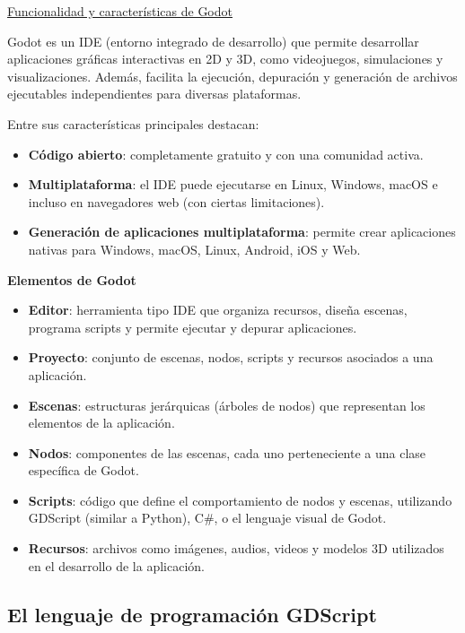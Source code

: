\documentclass[12pt]{book} %
\providecommand{\tightlist}{%
  \setlength{\itemsep}{0pt}\setlength{\parskip}{0pt}}
\begin{document}
\underline{Funcionalidad y características de Godot}

Godot es un IDE (entorno integrado de desarrollo) que permite
desarrollar aplicaciones gráficas interactivas en 2D y 3D, como
videojuegos, simulaciones y visualizaciones. Además, facilita la
ejecución, depuración y generación de archivos ejecutables
independientes para diversas plataformas.

Entre sus características principales destacan:

\begin{itemize}
\tightlist
\item
  \textbf{Código abierto}: completamente gratuito y con una comunidad
  activa.
\item
  \textbf{Multiplataforma}: el IDE puede ejecutarse en Linux, Windows,
  macOS e incluso en navegadores web (con ciertas limitaciones).
\item
  \textbf{Generación de aplicaciones multiplataforma}: permite crear
  aplicaciones nativas para Windows, macOS, Linux, Android, iOS y Web.
\end{itemize}

\textbf{Elementos de Godot}

\begin{itemize}
\tightlist
\item
  \textbf{Editor}: herramienta tipo IDE que organiza recursos, diseña
  escenas, programa scripts y permite ejecutar y depurar aplicaciones.
\item
  \textbf{Proyecto}: conjunto de escenas, nodos, scripts y recursos
  asociados a una aplicación.
\item
  \textbf{Escenas}: estructuras jerárquicas (árboles de nodos) que
  representan los elementos de la aplicación.
\item
  \textbf{Nodos}: componentes de las escenas, cada uno perteneciente a
  una clase específica de Godot.
\item
  \textbf{Scripts}: código que define el comportamiento de nodos y
  escenas, utilizando GDScript (similar a Python), C\#, o el lenguaje
  visual de Godot.
\item
  \textbf{Recursos}: archivos como imágenes, audios, videos y modelos 3D
  utilizados en el desarrollo de la aplicación.
\end{itemize}

\hypertarget{el-lenguaje-de-programaciuxf3n-gdscript}{%
\subsection{El lenguaje de programación
GDScript}\label{el-lenguaje-de-programaciuxf3n-gdscript}}
\end{document}
